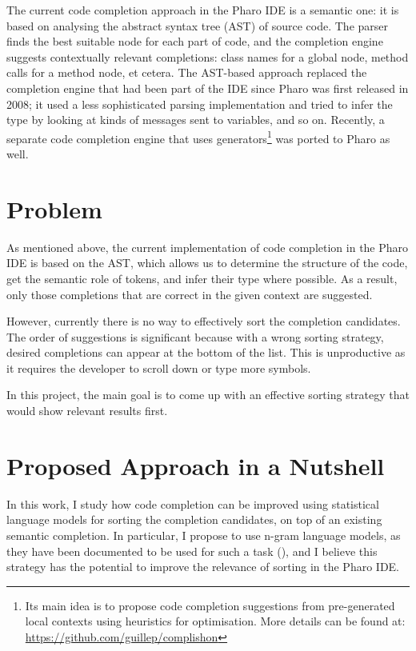 The current code completion approach in the Pharo IDE is a semantic one: it is based on analysing the abstract syntax tree (AST) of source code. The parser finds the best suitable node for each part of code, and the completion engine suggests contextually relevant completions: class names for a global node, method calls for a method node, et cetera. The AST-based approach replaced the completion engine that had been part of the IDE since Pharo was first released in 2008; it used a less sophisticated parsing implementation and tried to infer the type by looking at kinds of messages sent to variables, and so on. Recently, a separate code completion engine that uses generators\footnote{Its main idea is to propose code completion suggestions from pre-generated local contexts using heuristics for optimisation. More details can be found at: \url{https://github.com/guillep/complishon}} was ported to Pharo as well.

\section{Problem}
\label{sec:Introduction-Problem}
As mentioned above, the current implementation of code completion in the Pharo IDE is based on the AST, which allows us to determine the structure of the code, get the semantic role of tokens, and infer their type where possible. As a result, only those completions that are correct in the given context are suggested.

However, currently there is no way to effectively sort the completion candidates. The order of suggestions is significant because with a wrong sorting strategy, desired completions can appear at the bottom of the list. This is unproductive as it requires the developer to scroll down or type more symbols. 

In this project, the main goal is to come up with an effective sorting strategy that would show relevant results first. 

\section{Proposed Approach in a Nutshell}
\label{sec:Introduction-Approach}
In this work, I study how code completion can be improved using statistical language models for sorting the completion candidates, on top of an existing semantic completion. In particular, I propose to use n-gram language models, as they have been documented to be used for such a task (\cite{Hind12a}), and I believe this strategy has the potential to improve the relevance of sorting in the Pharo IDE.

